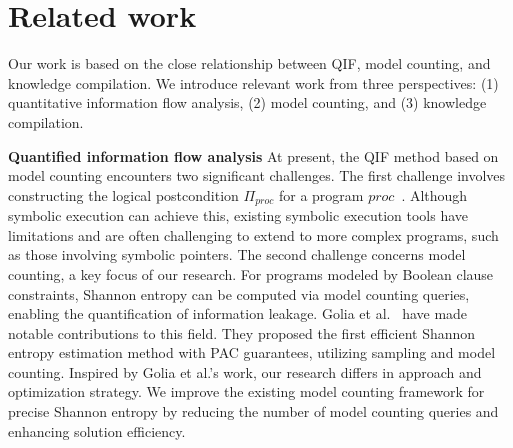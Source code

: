 \section{Related work}
\label{sec:Related}
Our work is based on the close relationship between QIF, model counting, and knowledge compilation.
We introduce relevant work from three perspectives: (1) quantitative information flow analysis, (2) model counting, and (3) knowledge compilation.

\textbf{Quantified information flow analysis} 
At present, the QIF method based on model counting encounters two significant challenges.
The first challenge involves constructing the logical postcondition $\Pi_{proc}$ for a program $proc$~\cite{zhou2018static}.
Although symbolic execution can achieve this, existing symbolic execution tools have limitations and are often challenging to extend to more complex programs, such as those involving symbolic pointers.
The second challenge concerns model counting, a key focus of our research. 
For programs modeled by Boolean clause constraints, Shannon entropy can be computed via model counting queries, enabling the quantification of information leakage.
Golia et al.~\cite{golia2022scalable} have made notable contributions to this field. 
They proposed the first efficient Shannon entropy estimation method with PAC guarantees, utilizing sampling and model counting. 
Inspired by Golia et al.'s work, our research differs in approach and optimization strategy. 
We improve the existing model counting framework for precise Shannon entropy by reducing the number of model counting queries and enhancing solution efficiency. 




